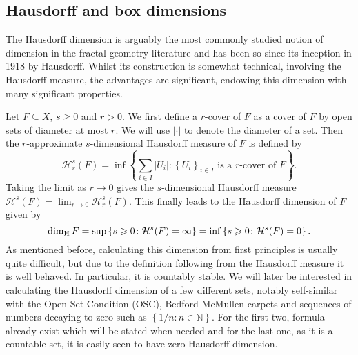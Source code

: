 \subsection{Hausdorff and box dimensions}
\label{sec:intro-haus-box}

The Hausdorff dimension is arguably the most commonly studied notion of dimension in the fractal geometry literature and has been so since its inception in 1918 by Hausdorff. Whilst its construction is somewhat technical, involving the Hausdorff measure, the advantages are significant, endowing this dimension with many significant properties. 

Let $F\subseteq X$, $s\ge 0$ and $r > 0$. We first define a $r$-cover of $F$ as a cover of $F$ by open sets of diameter at most $r$. We will use $\lvert \cdot \rvert$ to denote the diameter of a set. Then the $r$-approximate $s$-dimensional Hausdorff measure of $F$ is defined by 
\[
\mathcal{H}^s_r (F) = \inf\left\{ \sum_{i\in I} \lvert U_i \rvert \colon \left\{U_i \right\}_{i\in I} \text{ is a $r$-cover of }F  \right\}.
\]
Taking the limit as $r \rightarrow 0 $ gives the $s$-dimensional Hausdorff measure $\mathcal{H}^s(F) = \lim_{r\rightarrow 0} \mathcal{H}^s_r(F)$. This finally leads to the Hausdorff dimension of $F$ given by
\[
\dim_{\text{H}} F = \sup\left\{s \geqslant 0 \colon \mathcal{H}^s(F) = \infty\right\} = \inf\left\{s\geqslant 0 \colon \mathcal{H}^s(F) = 0\right\}.
\]
As mentioned before, calculating this dimension from first principles is usually quite difficult, but due to the definition following from the Hausdorff measure it is well behaved. In particular, it is countably stable. We will later be interested in calculating the Hausdorff dimension of a few different sets, notably self-similar with the Open Set Condition (OSC), Bedford-McMullen carpets and sequences of numbers decaying to zero such as $\left\{1/n \colon n\in \mathbb{N}\right\}$. For the first two, formula already exist which will be stated when needed and for the last one, as it is a countable set, it is easily seen to have zero Hausdorff dimension.


